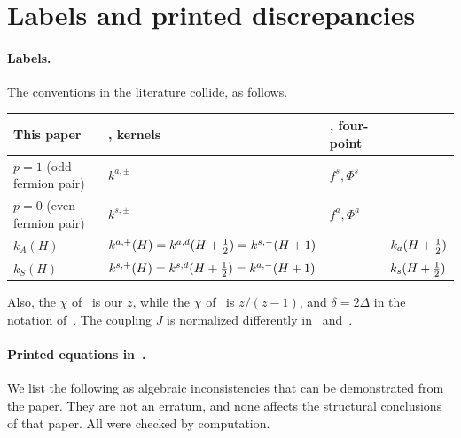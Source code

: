 \section{Labels and printed discrepancies}
\label{app:conventions}

\paragraph{Labels.} The conventions in the literature collide, as follows.

\begin{center}
\small
\renewcommand{\arraystretch}{1.2}
\begin{tabular}{@{}llll@{}}
\toprule
This paper & \cite{Peng:2017spg}, kernels & \cite{Peng:2017spg}, four-point & \cite{Fu:2016vas}\\
\midrule
$p=1$ (odd fermion pair) & $k^{a,\pm}$ & $f^s,\Phi^s$ & \\
$p=0$ (even fermion pair) & $k^{s,\pm}$ & $f^a,\Phi^a$ & \\
$k_A(H)$ & $k^{a,+}(H)=k^{a,d}(H+\tfrac12)=k^{s,-}(H+1)$ & & $k_a(H+\tfrac12)$\\
$k_S(H)$ & $k^{s,+}(H)=k^{s,d}(H+\tfrac12)=k^{a,-}(H+1)$ & & $k_s(H+\tfrac12)$\\
\bottomrule
\end{tabular}
\end{center}

Also, the $\chi$ of~\cite{Bulycheva:2018qcp} is our $z$, while the $\chi$ of~\cite{Peng:2017spg} is $z/(z-1)$, and $\delta=2\Delta$ in the notation of~\cite{Bulycheva:2018qcp}. The coupling $J$ is normalized differently in~\cite{Peng:2017spg} and~\cite{Fu:2016vas}.

\paragraph{Printed equations in~\cite{Bulycheva:2018qcp}.} We list the following as algebraic inconsistencies that can be demonstrated from the paper. They are not an erratum, and none affects the structural conclusions of that paper. All were checked by computation.

